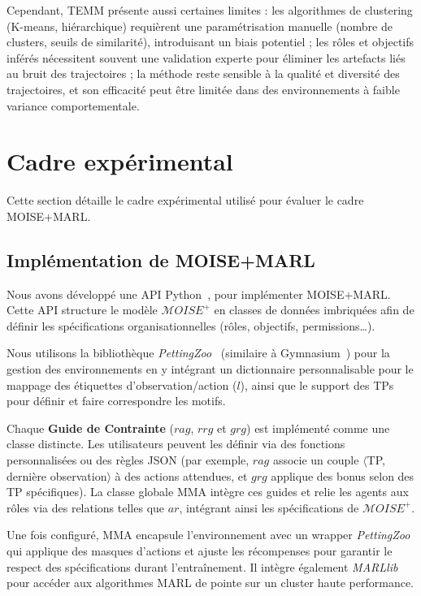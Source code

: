 \documentclass[francais,ROIA,Unicode,manuscript]{cedram}
\begin{document}
Cependant, TEMM présente aussi certaines limites : les algorithmes de clustering (K-means, hiérarchique) requièrent une paramétrisation manuelle (nombre de clusters, seuils de similarité), introduisant un biais potentiel ; les rôles et objectifs inférés nécessitent souvent une validation experte pour éliminer les artefacts liés au bruit des trajectoires ; la méthode reste sensible à la qualité et diversité des trajectoires, et son efficacité peut être limitée dans des environnements à faible variance comportementale.


\section{Cadre expérimental}
\label{sec:experimental_setup}

Cette section détaille le cadre expérimental utilisé pour évaluer le cadre MOISE+MARL.


\subsection{Implémentation de MOISE+MARL}

Nous avons développé une API Python~\hyperref[fn:github]{\footnotemark[2]}, pour implémenter MOISE+MARL. Cette API structure le modèle \(\mathcal{M}OISE^+\) en classes de données imbriquées afin de définir les spécifications organisationnelles (rôles, objectifs, permissions\dots).

Nous utilisons la bibliothèque \textit{PettingZoo}~\cite{terry2020pettingzoo} (similaire à Gymnasium~\cite{kwiatkowski2024}) pour la gestion des environnements en y intégrant un dictionnaire personnalisable pour le mappage des étiquettes d'observation/action (\(l\)), ainsi que le support des TPs pour définir et faire correspondre les motifs.

Chaque \textbf{Guide de Contrainte} (\(rag\), \(rrg\) et \(grg\)) est implémenté comme une classe distincte. Les utilisateurs peuvent les définir via des fonctions personnalisées ou des règles JSON (par exemple, \(rag\) associe un couple \(\langle\)TP, dernière observation\(\rangle\) à des actions attendues, et \(grg\) applique des bonus selon des TP spécifiques). La classe globale MMA intègre ces guides et relie les agents aux rôles via des relations telles que \(ar\), intégrant ainsi les spécifications de \(\mathcal{M}OISE^+\).

Une fois configuré, MMA encapsule l'environnement avec un wrapper \textit{PettingZoo} qui applique des masques d'actions et ajuste les récompenses pour garantir le respect des spécifications durant l'entraînement. Il intègre également \textit{MARLlib}~\cite{hu2021marlib} pour accéder aux algorithmes MARL de pointe sur un cluster haute performance.
\end{document}
